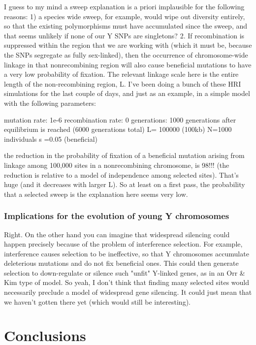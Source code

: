 \documentclass[9pt,twocolumn,twoside]{gsajnl}
\begin{document}
I guess to my mind a sweep explanation is a priori implausible for the following reasons: 1) a species wide sweep, for example, would wipe out diversity entirely, so that the existing polymorphisms must have accumulated since the sweep, and that seems unlikely if none of our Y SNPs are singletons? 2. If recombination is suppressed within the region that we are working with (which it must be, because the SNPs segregate as fully sex-linked), then the occurrence of chromosome-wide linkage in that nonrecombining region will also cause beneficial mutations to have a very low probability of fixation. The relevant linkage scale here is the entire length of the non-recombining region, L. I've been doing a bunch of these HRI simulations for the last couple of days, and just as an example, in a simple model with the following parameters:

mutation rate: 1e-6
recombination rate: 0
generations: 1000 generations after equilibrium is reached (6000 generations total)
L= 100000 (100kb)
N=1000 individuals
s =0.05 (beneficial)

the reduction in the probability of fixation of a beneficial mutation arising from linkage among 100,000 sites in a nonrecombining chromosome, is 98!!! (the reduction is relative to a model of independence among  selected sites). That's huge (and it decreases with larger L). So at least on a first pass, the probability that a selected sweep is the explanation here seems very low.

\subsubsection*{Implications for the evolution of young Y chromosomes}
Right. On the other hand you can imagine that widespread silencing could happen precisely because of the problem of interference selection. For example, interference causes selection to be ineffective, so that Y chromosomes accumulate deleterious mutations and do not fix beneficial ones. This could then generate selection to down-regulate or silence such "unfit" Y-linked genes, as in an Orr & Kim type of model. So yeah, I don't think that finding many selected sites would necessarily preclude a model of widespread gene silencing. It could just mean that we haven't gotten there yet (which would still be interesting).

\section*{Conclusions}
\end{document}
